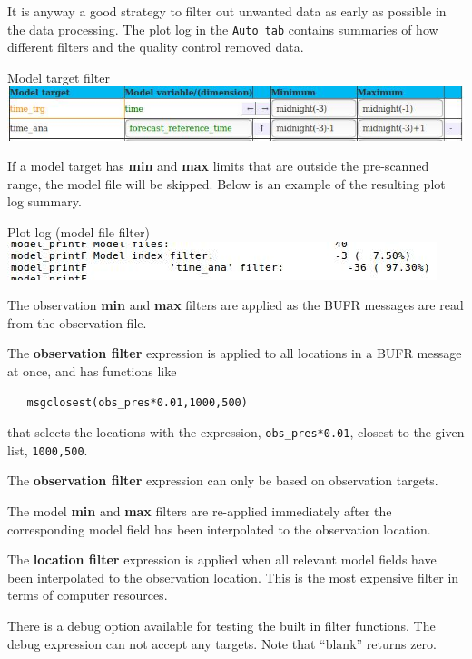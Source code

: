 \documentclass[letterpaper,10pt,twoside,twocolumn,openany]{book}
\begin{document}
It is anyway a good strategy to filter out unwanted data as early as possible in the data processing.
The plot log in the \lstinline!Auto tab! contains summaries of how different filters and the quality control removed data.
\begin{paperbox}{Model target filter}
  \includegraphics[width=\columnwidth]{filter_minmax.jpg}
\end{paperbox}
If a model target has {\bf min} and {\bf max} limits that are outside the pre-scanned range, 
the model file will be skipped. Below is an example of the resulting plot log summary.
\begin{paperbox}{Plot log (model file filter)}
  \includegraphics[width=\columnwidth]{filter_minmaxlog.jpg}
\end{paperbox}

The observation {\bf min} and {\bf max} filters are applied as the BUFR messages are read from the observation file.

The {\bf observation filter} expression is applied to all locations in a BUFR message at once,
and has functions like
\begin{lstlisting}
   msgclosest(obs_pres*0.01,1000,500)
\end{lstlisting}
that selects the locations with the expression, \lstinline!obs_pres*0.01!, closest to the given list, \lstinline!1000,500!.
\begin{quotebox}
  The {\bf observation filter} expression can only be based on observation targets.
\end{quotebox}

The model {\bf min} and {\bf max} filters are re-applied immediately after the corresponding 
model field has been interpolated to the observation location.

The {\bf location filter} expression is applied when all relevant model fields have been interpolated to the observation location.
This is the most expensive filter in terms of computer resources.

There is a debug option available for testing the built in filter functions.
The debug expression can not accept any targets.
Note that ``blank'' returns zero.
\end{document}
